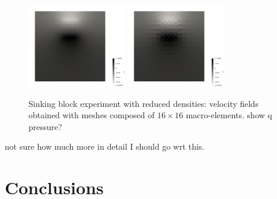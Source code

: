 \documentclass[a4paper,12pt]{article}
\begin{document}
\begin{figure}[t]
\includegraphics[width=4.3cm]{../results/exp08/fig16x16_reduced/press.0006.png}
\includegraphics[width=4.3cm]{../results/exp08/fig16x16_reduced/press.0007.png}
\caption{Sinking block experiment with reduced densities: velocity fields 
obtained with meshes composed of $16\times 16$ macro-elements.
{\color{red} show q pressure?}
 \label{fig:block4}}
\end{figure}


{\color{red} not sure how much more in detail I should go wrt this.}






\newpage
\section{Conclusions}\label{sec5}
\end{document}
